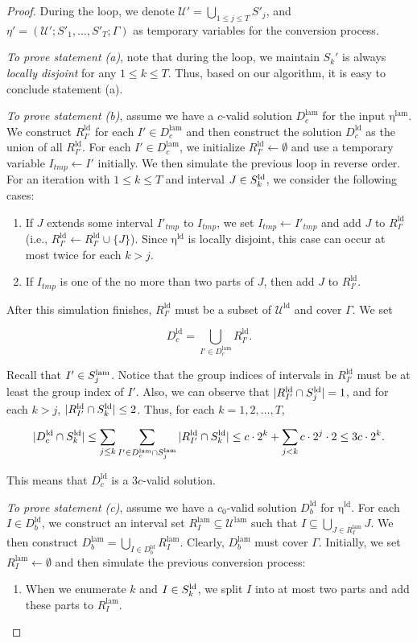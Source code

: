 \documentclass[11pt,a4paper]{article} \usepackage{enumitem}
\newcommand{\calU}{\mathcal{U}}
\newcommand{\ldU}{\operatorname{\calU^{ld}}}
\newcommand{\ldS}[1]{\ifx\relax#1\relax
    S^{\operatorname{ld}} \else
    S^{\operatorname{ld}}_{#1} \fi
}
\newcommand{\ldD}{D^{\operatorname{ld}}}
\newcommand{\ldeta}{\operatorname{\eta^{ld}}}
\newcommand{\lamD}{D^{\operatorname{lam}}}
\newcommand{\lamU}{\operatorname{\calU^{lam}}}
\newcommand{\lamS}[1]{\ifx\relax#1\relax
    S^{\operatorname{lam}}
  \else
    S^{\operatorname{lam}}_{#1} 
  \fi
}
\newcommand{\lameta}{\operatorname{\eta^{lam}}}
\newcommand{\ldR}{R^{\operatorname{ld}}}
\newcommand{\lamR}{R^{\operatorname{lam}}}
\theoremstyle{definition}
\begin{document}
\begin{proof}
During the loop, we denote $\calU' = \bigcup_{1 \leq j \leq T} S'_j$, and $\eta' = (\calU'; S'_1, \ldots, S'_T; \Gamma)$ as temporary variables for the conversion process.

\emph{To prove statement (a)}, note that during the loop, we maintain $S_k'$ is always \emph{locally disjoint} for any $1\leq k\leq T$. Thus, based on our algorithm, it is easy to conclude statement (a).

\emph{To prove statement (b)}, assume we have a $c$-valid solution $\lamD_c$ for the input $\lameta$. We construct $\ldR_{I'}$ for each $I' \in \lamD_c$ and then construct the solution $\ldD_c$ as the union of all $\ldR_{I'}$. For each $I' \in \lamD_c$, we initialize $\ldR_{I'} \gets \emptyset$ and use a temporary variable $I_{tmp} \gets I'$ initially. We then simulate the previous loop in reverse order. For an iteration with $1 \leq k \leq T$ and interval $J \in \ldS{k}$, we consider the following cases:

\begin{enumerate}[label=(\alph*), format=\normalfont]
    \item If $J$ extends some interval $I'_{tmp}$ to $I_{tmp}$, we set $I_{tmp} \gets I'_{tmp}$ and add $J$ to $\ldR_{I'}$ (i.e., $\ldR_{I'} \gets \ldR_{I'} \cup \{J\}$). 
    Since $\ldeta$ is locally disjoint, this case can occur at most twice for each $k > j$.  
    \item If $I_{tmp}$ is one of the no more than two parts of $J$, then add $J$ to $\ldR_{I'}$.
\end{enumerate}

After this simulation finishes, $\ldR_{I'}$ must be a subset of $\ldU$ and cover $\Gamma$. We set 

$$\ldD_c = \bigcup_{I' \in \lamD_c} \ldR_{I'}.$$

Recall that $I' \in \lamS{j}$. Notice that the group indices of intervals in $\ldR_{I'}$ must be at least the group index of $I'$. Also, we can observe that $|\ldR_{I'} \cap \ldS{j}| = 1$, and for each $k > j$, $|\ldR_{I'} \cap \ldS{k}| \leq 2$. Thus, for each $k = 1, 2, \dots, T$, 

$$|\ldD_c \cap \ldS{k}| \leq \sum_{j \leq k} \sum_{I' \in \lamD_c \cap \lamS{j}} |\ldR_{I'} \cap \ldS{k}| \leq c \cdot 2^k + \sum_{j < k} c \cdot 2^j \cdot 2 \leq 3c \cdot 2^k.$$

This means that $\ldD_c$ is a $3c$-valid solution.

\emph{To prove statement (c)}, assume we have a $c_0$-valid solution $\ldD_b$ for $\ldeta$. For each $I \in \ldD_b$, we construct an interval set $\lamR_I \subseteq \lamU$ such that $I \subseteq \bigcup_{J \in \lamR_I} J$. 
We then construct $\lamD_b = \bigcup_{I \in \ldD_b} \lamR_I$. Clearly, $\lamD_b$ must cover $\Gamma$. Initially, we set $\lamR_I \gets \emptyset$ and then simulate the previous conversion process:    
\begin{enumerate}
\item When we enumerate $k$ and $I \in \ldS{k}$, we split $I$ into at most two parts and add these parts to $\lamR_I$.


\end{enumerate}
\end{proof}
\end{document}
